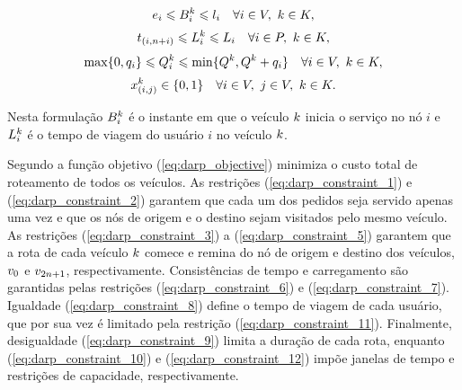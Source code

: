 %
\begin{equation} \label{eq:darp_constraint_10}
  e_i 
  \leqslant
  B^k_{i}
  \leqslant
  l_i
  \quad
  \forall i \in V,
  \ k \in K,
\end{equation}
%
\begin{equation} \label{eq:darp_constraint_11}
  t_{(i,n + i)}
  \leqslant
  L_i^{k}
  \leqslant
  L_i
  \quad
  \forall i \in P,
  \ k \in K,
\end{equation}
%
\begin{equation} \label{eq:darp_constraint_12}
  \max \{0, q_{i}\}
  \leqslant
  Q^{k}_i
  \leqslant
  \min \{Q^{k}, Q^{k} + q_{i}\}
  \quad
  \forall i \in V,
  \ k \in K,
\end{equation}
%
\begin{equation} \label{eq:darp_constraint_13}
  x_{(i, j)}^{k} \in \{0, 1\}
  \quad
  \forall i \in V,
  \ j \in V,
  \ k \in K.
\end{equation}

Nesta formulação $B_i^k$ é o instante em que o veículo $k$ inicia
o serviço no nó $i$ e $L^k_i$ é o tempo de viagem do usuário
$i$ no veículo $k$.

Segundo \textcite{cordeau_branch-and-cut_2006}
a função objetivo (\ref{eq:darp_objective})  minimiza o custo total de 
roteamento de todos os veículos. 
As restrições (\ref{eq:darp_constraint_1}) e (\ref{eq:darp_constraint_2}) 
garantem que cada um dos pedidos seja servido apenas uma vez e que os nós de 
origem e o destino sejam visitados pelo mesmo veículo.
As restrições (\ref{eq:darp_constraint_3}) a (\ref{eq:darp_constraint_5})
garantem que a rota de cada veículo $k$ comece e remina do nó de origem
e destino dos veículos, $v_{0}$ e $v_{2n + 1}$, respectivamente.
Consistências de tempo e carregamento são garantidas pelas restrições
(\ref{eq:darp_constraint_6}) e (\ref{eq:darp_constraint_7}).
Igualdade (\ref{eq:darp_constraint_8}) define o tempo de viagem de cada
usuário, que por sua vez é limitado pela restrição
(\ref{eq:darp_constraint_11}).
Finalmente, desigualdade (\ref{eq:darp_constraint_9}) limita a duração de cada
rota, enquanto (\ref{eq:darp_constraint_10}) e (\ref{eq:darp_constraint_12})
impõe janelas de tempo e restrições de capacidade, respectivamente.





